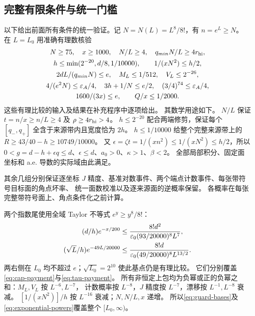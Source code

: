 \documentclass[UTF8,a4paper,11pt,fontset=fandol]{ctexart}
\theoremstyle{remark}
\begin{document}
\subsection{完整有限条件与统一门槛}\label{subsec:finite-guards}
以下给出前面所有条件的统一验证。记 $N=N(L)=L^8/8!$，有 $n=e^L\ge N$。
在 $L=L_0$ 用准确有理数核验
\begin{equation}\label{eq:guard-bases}
\begin{gathered}
 N\ge75,\quad x\ge1000,\quad N/L\ge4,\quad q_{min}N/L\ge4r_{\rm hi},\\
 h\le\min(2^{-20},d/8,1/10000),\qquad1/(xN^2)\le h/2,\\
 2dL/(q_{min}N)\le e,\quad M_L\le1/512,\quad V_L\le2^{-26},\\
 4/(e^2N)\le\varepsilon_A/4,\quad3h+1/N\le e/2,
 \quad(3/4)^{74}\le\varepsilon_A/4,\\
 1600/(3x)\le e,\qquad Q/x\le1/2000.
\end{gathered}
\end{equation}
这些有理比较的输入及结果在补充程序中逐项给出。
其数学用途如下。
$N/L$ 保证 $t=n/x\ge n/L\ge4$ 及 $\rho\ge4r_{\rm hi}>4$。
$h\le2^{-20}$ 配合两端修剪，保证每个 $[q_-,q_+]$ 全含于来源带内且宽度恰为 $2h$。
$h\le1/10000$ 给整个完整来源带上的 $R\ge43/40-h\ge10749/10000$。
又 $\epsilon=\zeta t=1/(xn^2)\le1/(xN^2)\le h/2$，所以
$0<g=d-h+\epsilon q\le d$、$\epsilon\le d$、$a_0>0$、$\kappa>1$、$\beta<2$。
全部局部积分、固定面坐标和 a.e. 导数的实际域由此满足。

其余几组分别保证逐坐标 $J$ 精度、基准对数事件、两个端点计数事件、每张带符号目标面的角点坏率、
统一面数校准以及逐来源面的逆概率保留。
各概率在每张完整带符号面上、角点条件化之前计算。

两个指数尾使用全域 Taylor 不等式 $e^y\ge y^8/8!$：
\begin{align}
 (d/h)e^{-x/200}
 &\le\frac{8!d^2}{\varepsilon_0(93/20000)^8L^7},\notag\\
 (\sqrt L/h)e^{-49L/20000}
 &\le\frac{8!d}{\varepsilon_0(49/20000)^8L^{13/2}}.
 \label{eq:exponential-powers}
\end{align}
两右侧在 $L_0$ 均不超过 $e$；$\sqrt{L_0}=2^{10}$ 使此基点仍是有理比较。
它们分别覆盖\eqref{eq:cap-payment}与\eqref{eq:tau-payment}。
所有非恒定上包均为负幂或正的负幂之和：$M_L,V_L$ 按 $L^{-6},L^{-7}$，
计数概率按 $L^{-8}$，$J$ 精度按 $L^{-7}$，漂移按 $L^{-1},L^{-8}$ 衰减。
$[1/(xN^2)]/h$ 按 $L^{-16}$ 衰减；$N,N/L,x$ 递增。
所以\eqref{eq:guard-bases}及\eqref{eq:exponential-powers}覆盖整个 $[L_0,\infty)$。
\end{document}

